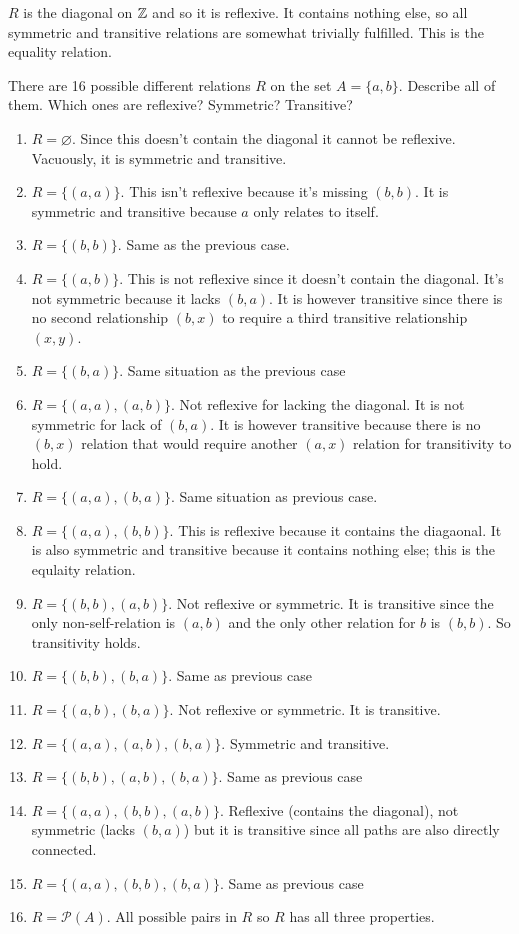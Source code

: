 \documentclass{article}
\begin{document}
$R$ is the diagonal on $\mathbb{Z}$ and so it is reflexive. It contains nothing else, so all symmetric and transitive relations are somewhat trivially fulfilled. This is the equality relation.

\begin{problem}
There are 16 possible different relations $R$ on the set $A = \{a, b\}$. Describe all of them. Which ones are reflexive? Symmetric? Transitive?
\end{problem}

\begin{enumerate}
  \item $R = \varnothing$. Since this doesn't contain the diagonal it cannot be reflexive. Vacuously, it is symmetric and transitive.
  \item $R = \{(a, a)\}$. This isn't reflexive because it's missing $(b, b)$. It is symmetric and transitive because $a$ only relates to itself.
  \item $R = \{(b, b)\}$. Same as the previous case.
  \item $R = \{(a, b)\}$. This is not reflexive since it doesn't contain the diagonal. It's not symmetric because it lacks $(b, a)$. It is however transitive since there is no second relationship $(b, x)$ to require a third transitive relationship $(x, y)$.
  \item $R = \{(b, a)\}$. Same situation as the previous case
  \item $R = \{(a, a), (a, b)\}$. Not reflexive for lacking the diagonal. It is not symmetric for lack of $(b, a)$. It is however transitive because there is no $(b, x)$ relation that would require another $(a, x)$ relation for transitivity to hold.
  \item $R = \{(a, a), (b, a)\}$. Same situation as previous case.
  \item $R = \{ (a, a), (b, b)\}$. This is reflexive because it contains the diagaonal. It is also symmetric and transitive because it contains nothing else; this is the equlaity relation.
  \item $R = \{ (b, b), (a, b)\}$. Not reflexive or symmetric. It is transitive since the only non-self-relation is $(a, b)$ and the only other relation for $b$ is $(b, b)$. So transitivity holds.
  \item $R = \{(b, b), (b, a)\}$. Same as previous case
  \item $R = \{(a, b), (b, a)\}$. Not reflexive or symmetric. It is transitive.
  \item $R = \{(a, a), (a, b), (b, a)\}$. Symmetric and transitive.
  \item $R = \{(b, b), (a, b), (b, a)\}$. Same as previous case
  \item $R = \{(a, a), (b, b), (a, b)\}$. Reflexive (contains the diagonal), not symmetric (lacks $(b, a)$) but it is transitive since all paths are also directly connected.
  \item $R = \{(a, a), (b, b), (b, a)\}$. Same as previous case
  \item $R = \mathcal{P}(A)$. All possible pairs in $R$ so $R$ has all three properties.
\end{enumerate}
\end{document}
